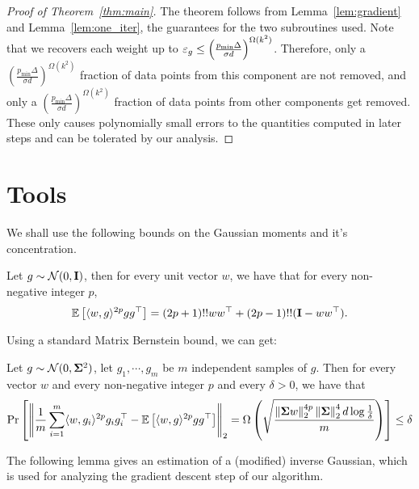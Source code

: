 \begin{proof}[Proof of Theorem~\ref{thm:main}]
The theorem follows from Lemma~\ref{lem:gradient} and Lemma~\ref{lem:one_iter}, the guarantees for the two subroutines used. Note that we recovers each weight up to $\varepsilon_g \le \left(\frac{p_{\min} \Delta}{\sigma d}\right)^{\Omega(k^2)}$. 
Therefore, only a $\left(\frac{p_{\min} \Delta}{\sigma d}\right)^{\Omega(k^2)}$ fraction of data points from this component are not removed, and only a $\left(\frac{p_{\min} \Delta}{\sigma d}\right)^{\Omega(k^2)}$ fraction of data points from other components get removed. These only causes polynomially small errors to the quantities computed in later steps and can be tolerated by our analysis. 
\end{proof}

\section{Tools}


We shall use the following bounds on the Gaussian moments and it's concentration.

\begin{lemma}
Let $g \sim \mathcal{N}(0, \bold{I})$, then for every unit vector $w$, we have that for every non-negative integer $p$, 
$$
 \mathbb{E}\left[\langle w, g \rangle^{2p} g g^{\top}\right] =  (2p + 1)!! w w^{\top} + (2p - 1)!! (\bold{I} - w w^{\top} ).
$$
\end{lemma}


Using a standard Matrix Bernstein bound, we can get:
\begin{lemma}\label{lem:gsb}
Let $g \sim \mathcal{N}(0, \bold{\Sigma}^2)$, let $g_1, \cdots, g_m$ be $m$ independent samples of $g$.  Then for every vector $w$ and every non-negative integer $p$ and every $\delta > 0$, we have that 
\begin{align}
\Pr\left[\left\|\frac{1}{m}\sum_{i = 1}^m \langle w, g_i \rangle^{2p} g_i g_i^{\top} - \mathbb{E}\left[\langle w, g \rangle^{2p} g g^{\top}\right] \right\|_2 = \Omega\left( \sqrt{  \frac{\| \bold{\Sigma} w \|_2^{4p} \left\| \bold{\Sigma} \right\|^4_2 d \log \frac{1}{\delta}}{ m} } \right)\right] \leq \delta
\end{align}
\end{lemma}




The following lemma gives an estimation of a (modified) inverse Gaussian, which is used for analyzing the gradient descent step of our algorithm.

